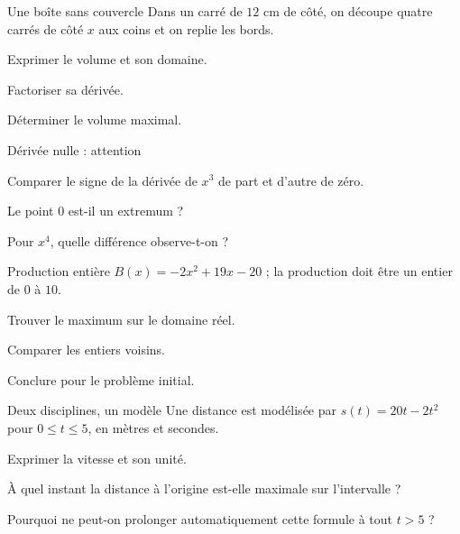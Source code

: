\begingroup\renewcommand{\otBesoinPlace}[1]{}\begin{minipage}{\linewidth}
\begin{exercice}[3]{Une boîte sans couvercle}
Dans un carré de $12$ cm de côté, on découpe quatre carrés de côté $x$ aux coins et on replie les bords.
\begin{questions}
\item Exprimer le volume et son domaine.
\item Factoriser sa dérivée.
\item Déterminer le volume maximal.
\end{questions}
\end{exercice}
\begin{exercice}[3]{Dérivée nulle : attention}

\begin{questions}
\item Comparer le signe de la dérivée de $x^3$ de part et d’autre de zéro.
\item Le point $0$ est-il un extremum ?
\item Pour $x^4$, quelle différence observe-t-on ?
\end{questions}
\end{exercice}
\begin{exercice}[3]{Production entière}
$B(x)=-2x^2+19x-20$ ; la production doit être un entier de $0$ à $10$.
\begin{questions}
\item Trouver le maximum sur le domaine réel.
\item Comparer les entiers voisins.
\item Conclure pour le problème initial.
\end{questions}
\end{exercice}
\begin{exercice}[3]{Deux disciplines, un modèle}
Une distance est modélisée par $s(t)=20t-2t^2$ pour $0\leq t\leq5$, en mètres et secondes.
\begin{questions}
\item Exprimer la vitesse et son unité.
\item À quel instant la distance à l’origine est-elle maximale sur l’intervalle ?
\item Pourquoi ne peut-on prolonger automatiquement cette formule à tout $t>5$ ?
\end{questions}
\end{exercice}
\end{minipage}\endgroup
